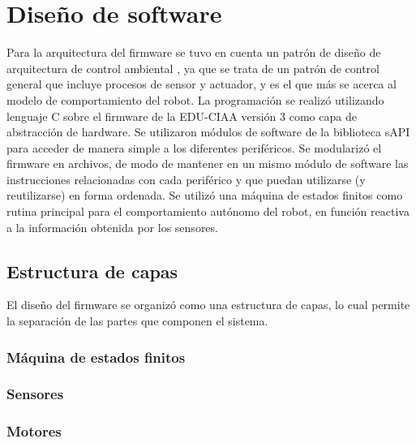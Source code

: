

\section{Diseño de software}

Para la arquitectura del firmware se tuvo en cuenta un patrón de diseño de arquitectura de control ambiental \citep{arq}, ya que se trata de un patrón de control general que incluye procesos de sensor y actuador, y es el que más se acerca al modelo de comportamiento del robot.
La programación se realizó utilizando lenguaje C sobre el firmware de la EDU-CIAA versión 3 como capa de abstracción de hardware. 
Se utilizaron módulos de software de la biblioteca sAPI para acceder de manera simple a los diferentes periféricos.
Se modularizó el firmware en archivos, de modo de mantener en un mismo módulo de software las instrucciones relacionadas con cada periférico y que puedan utilizarse (y reutilizarse) en forma ordenada. 
Se utilizó una máquina de estados finitos como rutina principal para el comportamiento autónomo del robot, en función reactiva a la información obtenida por los sensores.


\subsection{Estructura de capas}
El diseño del firmware se organizó como una estructura de capas, lo cual permite la separación de las partes que componen el sistema.


		\subsubsection{Máquina de estados finitos}
		\subsubsection{Sensores}
		\subsubsection{Motores}


